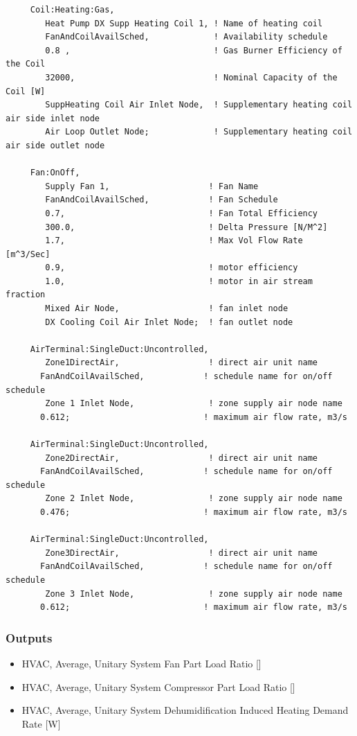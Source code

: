 \begin{lstlisting}
     Coil:Heating:Gas,
        Heat Pump DX Supp Heating Coil 1, ! Name of heating coil
        FanAndCoilAvailSched,             ! Availability schedule
        0.8 ,                             ! Gas Burner Efficiency of the Coil
        32000,                            ! Nominal Capacity of the Coil [W]
        SuppHeating Coil Air Inlet Node,  ! Supplementary heating coil air side inlet node
        Air Loop Outlet Node;             ! Supplementary heating coil air side outlet node

     Fan:OnOff,
        Supply Fan 1,                    ! Fan Name
        FanAndCoilAvailSched,            ! Fan Schedule
        0.7,                             ! Fan Total Efficiency
        300.0,                           ! Delta Pressure [N/M^2]
        1.7,                             ! Max Vol Flow Rate  [m^3/Sec]
        0.9,                             ! motor efficiency
        1.0,                             ! motor in air stream fraction
        Mixed Air Node,                  ! fan inlet node
        DX Cooling Coil Air Inlet Node;  ! fan outlet node

     AirTerminal:SingleDuct:Uncontrolled,
        Zone1DirectAir,                  ! direct air unit name
       FanAndCoilAvailSched,            ! schedule name for on/off schedule
        Zone 1 Inlet Node,               ! zone supply air node name
       0.612;                           ! maximum air flow rate, m3/s

     AirTerminal:SingleDuct:Uncontrolled,
        Zone2DirectAir,                  ! direct air unit name
       FanAndCoilAvailSched,            ! schedule name for on/off schedule
        Zone 2 Inlet Node,               ! zone supply air node name
       0.476;                           ! maximum air flow rate, m3/s

     AirTerminal:SingleDuct:Uncontrolled,
        Zone3DirectAir,                  ! direct air unit name
       FanAndCoilAvailSched,            ! schedule name for on/off schedule
        Zone 3 Inlet Node,               ! zone supply air node name
       0.612;                           ! maximum air flow rate, m3/s
\end{lstlisting}

\subsubsection{Outputs}\label{outputs-2-024}

\begin{itemize}
\item
  HVAC, Average, Unitary System Fan Part Load Ratio {[]}
\item
  HVAC, Average, Unitary System Compressor Part Load Ratio {[]}
\item
  HVAC, Average, Unitary System Dehumidification Induced Heating Demand Rate {[}W{]}
\end{itemize}

